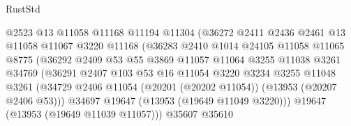 \begin{lexlean}{RustStd}
\begin{coremodule}
                                  @2523
                                  @13
                                  @11058
                                  @11168
                                  @11194
                                  @11304
                                  (@36272
                                    @2411
                                    @2436
                                    @2461
                                    @13
                                    @11058
                                    @11067
                                    @3220
                                    @11168
                                    (@36283
                                      @2410
                                      @1014
                                      @24105
                                      @11058
                                      @11065
                                      @8775
                                      (@36292
                                        @2409
                                        @53
                                        @55
                                        @3869
                                        @11057
                                        @11064
                                        @3255
                                        @11038
                                        @3261
                                        @34769
                                        (@36291
                                          @2407
                                          @103
                                          @53
                                          @16
                                          @11054
                                          @3220
                                          @3234
                                          @3255
                                          @11048
                                          @3261
                                          (@34729
                                            @2406
                                            @11054
                                            (@20201 (@20202 @11054))
                                            (@13953 (@20207 @2406 @53)))
                                          @34697
                                          @19647
                                          (@13953 (@19649 @11049 @3220)))
                                        @19647
                                        (@13953 (@19649 @11039 @11057)))
                                      @35607
                                      @35610

\end{coremodule}
\end{lexlean}
